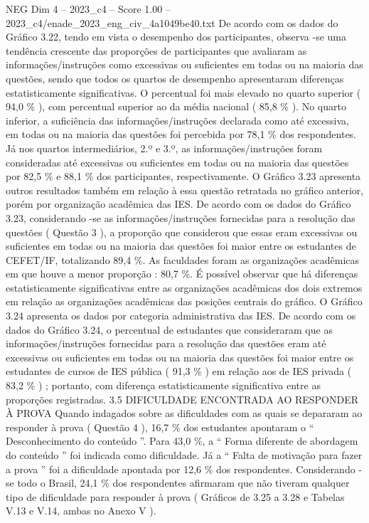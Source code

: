 \begin{textsample}{NEG Dim 4 – 2023\_c4 – Score 1.00 – 2023\_c4/enade\_2023\_eng\_civ\_4a1049be40.txt}
De acordo com os dados do Gráfico 3.22, tendo em vista o desempenho dos participantes, observa -se uma tendência crescente das proporções de participantes que avaliaram as informações/instruções como excessivas ou suficientes em todas ou na maioria das questões, sendo que todos os quartos de desempenho apresentaram diferenças estatisticamente significativas.
O percentual foi mais elevado no quarto superior ( 94,0 \% ), com percentual superior ao da média nacional ( 85,8 \% ).
No quarto inferior, a suficiência das informações/instruções declarada como até excessiva, em todas ou na maioria das questões foi percebida por 78,1 \% dos respondentes.
Já nos quartos intermediários, 2.º e 3.º, as informações/instruções foram consideradas até excessivas ou suficientes em todas ou na maioria das questões por 82,5 \% e 88,1 \% dos participantes, respectivamente.
O Gráfico 3.23 apresenta outros resultados também em relação à essa questão retratada no gráfico anterior, porém por organização acadêmica das IES.
De acordo com os dados do Gráfico 3.23, considerando -se as informações/instruções fornecidas para a resolução das questões ( Questão 3 ), a proporção que considerou que essas eram excessivas ou suficientes em todas ou na maioria das questões foi maior entre os estudantes de CEFET/IF, totalizando 89,4 \%.
As faculdades foram as organizações acadêmicas em que houve a menor proporção : 80,7 \%.
É possível observar que há diferenças estatisticamente significativas entre as organizações acadêmicas dos dois extremos em relação as organizações acadêmicas das posições centrais do gráfico.
O Gráfico 3.24 apresenta os dados por categoria administrativa das IES.
De acordo com os dados do Gráfico 3.24, o percentual de estudantes que consideraram que as informações/instruções fornecidas para a resolução das questões eram até excessivas ou suficientes em todas ou na maioria das questões foi maior entre os estudantes de cursos de IES pública ( 91,3 \% ) em relação aos de IES privada ( 83,2 \% ) ; portanto, com diferença estatisticamente significativa entre as proporções registradas. 3.5 DIFICULDADE ENCONTRADA AO RESPONDER À PROVA Quando indagados sobre as dificuldades com as quais se depararam ao responder à prova ( Questão 4 ), 16,7 \% dos estudantes apontaram o “ Desconhecimento do conteúdo ”.
Para 43,0 \%, a “ Forma diferente de abordagem do conteúdo ” foi indicada como dificuldade.
Já a “ Falta de motivação para fazer a prova ” foi a dificuldade apontada por 12,6 \% dos respondentes.
Considerando -se todo o Brasil, 24,1 \% dos respondentes afirmaram que não tiveram qualquer tipo de dificuldade para responder à prova ( Gráficos de 3.25 a 3.28 e Tabelas V.13 e V.14, ambas no Anexo V ).

\end{textsample}
